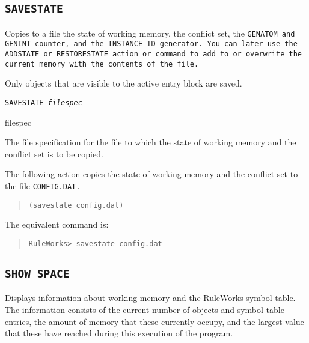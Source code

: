 {{\subsection{\tt{SAVESTATE}}

Copies to a file the state of working memory, the conflict set, the
\tt{GENATOM} and \tt{GENINT} counter, and the \tt{INSTANCE-ID}
generator. You can later use the \tt{ADDSTATE} or \tt{RESTORESTATE}
action or command to add to or overwrite the current memory with the
contents of the file.

Only objects that are visible to the active entry block are saved.

\Format

\tt{SAVESTATE} \it{filespec}

\begin{arguments}
\item[filespec]

  The file specification for the file to which the state of working
  memory and the conflict set is to be copied.
\end{arguments}

\Example

The following action copies the state of working memory and
the conflict set to the file \tt{CONFIG.DAT}.

\begin{quote}
\begin{verbatim}
(savestate config.dat)
\end{verbatim}
\end{quote}

The equivalent command is:

\begin{quote}
\begin{verbatim}
RuleWorks> savestate config.dat
\end{verbatim}
\end{quote}

\subsection{\tt{SHOW SPACE}}

Displays information about working memory and the RuleWorks
symbol table. The information consists of the current number
of objects and symbol-table entries, the amount of memory
that these currently occupy, and the largest value that these
have reached during this execution of the program.

\Format

}}
